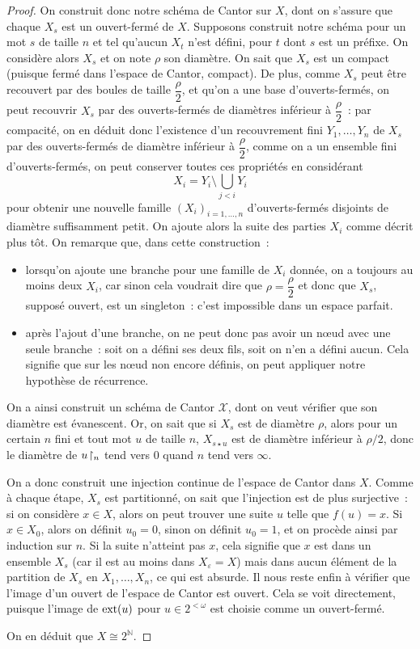 \begin{proof}
  On construit donc notre schéma de Cantor sur $X$, dont on s'assure que
  chaque $X_s$ est un ouvert-fermé de $X$. Supposons construit notre schéma pour
  un mot $s$ de taille $n$ et tel qu'aucun $X_t$ n'est défini, pour $t$ dont
  $s$ est un préfixe. On considère alors $X_s$ et on note $\rho$ son diamètre.
  On sait que $X_s$ est un compact (puisque fermé dans l'espace de Cantor,
  compact). De plus, comme $X_s$ peut être recouvert par des boules de taille
  $\dfrac{\rho}{2}$, et qu'on a une base d'ouverts-fermés, on peut recouvrir
  $X_s$ par des ouverts-fermés de diamètres inférieur à $\dfrac{\rho}{2}$~: par
  compacité, on en déduit donc l'existence d'un recouvrement fini
  $Y_1,\ldots,Y_n$ de $X_s$ par des ouverts-fermés de diamètre inférieur à
  $\dfrac{\rho}{2}$, comme on a un ensemble fini d'ouverts-fermés, on peut
  conserver toutes ces propriétés en considérant
  \[X_i = Y_i \setminus \bigcup_{ j < i} Y_i\]
  pour obtenir une nouvelle famille $(X_i)_{i = 1,\ldots, n}$ d'ouverts-fermés
  disjoints de diamètre suffisamment petit. On ajoute alors la suite des
  parties $X_i$ comme décrit plus tôt. On remarque que, dans cette
  construction~:
  \begin{itemize}
  \item lorsqu'on ajoute une branche pour une famille de $X_i$ donnée, on
    a toujours au moins deux $X_i$, car sinon cela voudrait dire que
    $\rho = \dfrac{\rho}{2}$ et donc que $X_s$, supposé ouvert, est un
    singleton~: c'est impossible dans un espace parfait.
  \item après l'ajout d'une branche, on ne peut donc pas avoir un n\oe ud avec
    une seule branche~: soit on a défini ses deux fils, soit on n'en a
    défini aucun. Cela signifie que sur les n\oe ud non encore définis, on peut
    appliquer notre hypothèse de récurrence.
  \end{itemize}
  On a ainsi construit un schéma de Cantor $\mathcal X$, dont on veut vérifier
  que son diamètre est évanescent. Or, on sait que si $X_s$ est de diamètre
  $\rho$, alors pour un certain $n$ fini et tout mot $u$ de taille $n$,
  $X_{s\star u}$ est de diamètre inférieur à $\rho/2$, donc le diamètre de
  $u\!\upharpoonright_{n}$ tend vers $0$ quand $n$ tend vers $\infty$.

  On a donc construit une injection continue de l'espace de Cantor dans $X$.
  Comme à chaque étape, $X_s$ est partitionné, on sait que l'injection est de
  plus surjective~: si on considère $x \in X$, alors on peut trouver une suite
  $u$ telle que $f(u) = x$. Si $x \in X_0$, alors on définit $u_0 = 0$, sinon
  on définit $u_0 = 1$, et on procède ainsi par induction sur $n$. Si la suite
  n'atteint pas $x$, cela signifie que $x$ est dans un ensemble $X_s$ (car il
  est au moins dans $X_\varepsilon = X$) mais dans aucun élément de la partition
  de $X_s$ en $X_1,\ldots,X_n$, ce qui est absurde. Il nous reste enfin à
  vérifier que l'image d'un ouvert de l'espace de Cantor est ouvert. Cela se
  voit directement, puisque l'image de $\operatorname{ext}(u)$ pour $u\in 2^{<\omega}$ est
  choisie comme un ouvert-fermé.

  On en déduit que $X \cong 2^\mathbb N$.
\end{proof}

